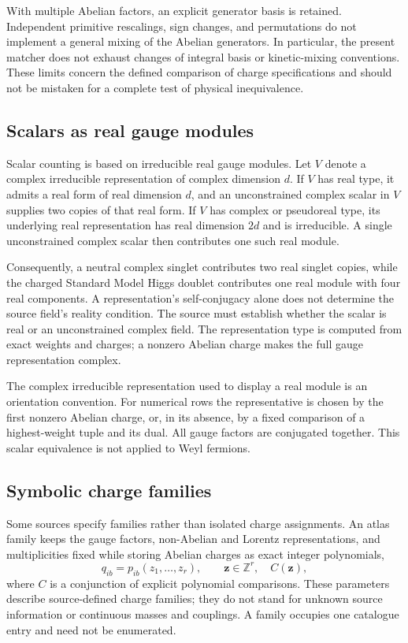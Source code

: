 With multiple Abelian factors, an explicit generator basis is retained. Independent primitive rescalings, sign changes, and permutations do not implement a general mixing of the Abelian generators. In particular, the present matcher does not exhaust changes of integral basis or kinetic-mixing conventions. These limits concern the defined comparison of charge specifications and should not be mistaken for a complete test of physical inequivalence.

\subsection{Scalars as real gauge modules}
\label{sec:scalars}

Scalar counting is based on irreducible real gauge modules. Let $V$ denote a complex irreducible representation of complex dimension $d$. If $V$ has real type, it admits a real form of real dimension $d$, and an unconstrained complex scalar in $V$ supplies two copies of that real form. If $V$ has complex or pseudoreal type, its underlying real representation has real dimension $2d$ and is irreducible. A single unconstrained complex scalar then contributes one such real module.

Consequently, a neutral complex singlet contributes two real singlet copies, while the charged Standard Model Higgs doublet contributes one real module with four real components. A representation's self-conjugacy alone does not determine the source field's reality condition. The source must establish whether the scalar is real or an unconstrained complex field. The representation type is computed from exact weights and charges; a nonzero Abelian charge makes the full gauge representation complex.

The complex irreducible representation used to display a real module is an orientation convention. For numerical rows the representative is chosen by the first nonzero Abelian charge, or, in its absence, by a fixed comparison of a highest-weight tuple and its dual. All gauge factors are conjugated together. This scalar equivalence is not applied to Weyl fermions.

\subsection{Symbolic charge families}
\label{sec:families}

Some sources specify families rather than isolated charge assignments. An atlas family keeps the gauge factors, non-Abelian and Lorentz representations, and multiplicities fixed while storing Abelian charges as exact integer polynomials,
\begin{equation}
q_{ib}=p_{ib}(z_1,\ldots,z_r),\qquad
\mathbf z\in\mathbb Z^r,\quad C(\mathbf z),
\label{eq:family}
\end{equation}
where $C$ is a conjunction of explicit polynomial comparisons. These parameters describe source-defined charge families; they do not stand for unknown source information or continuous masses and couplings. A family occupies one catalogue entry and need not be enumerated.

